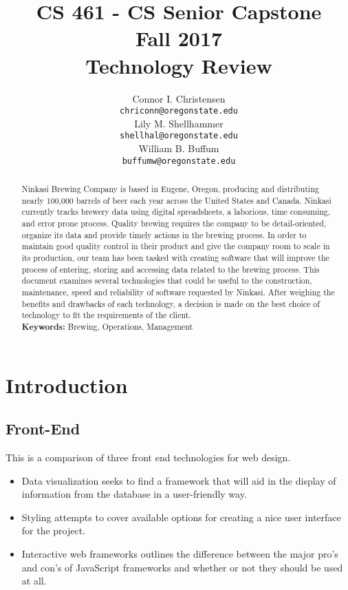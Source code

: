 \documentclass[draftclsnofoot,onecolumn,letterpaper,10pt,compsoc]{IEEEtran}
\title{CS 461 - CS Senior Capstone
	\\Fall 2017
	\\Technology Review
}
\author{
	Connor I. Christensen \\
	\texttt{chriconn@oregonstate.edu}
	\\
	Lily M. Shellhammer \\
	\texttt{shellhal@oregonstate.edu}
	\\
	William B. Buffum \\
	\small{}
	\texttt{buffumw@oregonstate.edu}
}
\begin{document}
\begin{titlingpage}
    \maketitle
    \begin{abstract}
			Ninkasi Brewing Company is based in Eugene, Oregon, producing and distributing nearly 100,000 barrels of beer each year across the United States and Canada.
			Ninkasi currently tracks brewery data using digital spreadsheets, a laborious, time consuming, and error prone process.
			Quality brewing requires the company to be detail-oriented, organize its data and provide timely actions in the brewing process.
			In order to maintain good quality control in their product and give the company room to scale in its production, our team has been tasked with creating software that will improve the process of entering, storing and accessing data related to the brewing process.
			This document examines several technologies that could be useful to the construction, maintenance, speed and reliability of software requested by Ninkasi.
			After weighing the benefits and drawbacks of each technology, a decision is made on the best choice of technology to fit the requirements of the client.
			\\
			\textbf{Keywords:} Brewing, Operations, Management
    \end{abstract}
		\pagebreak
		\tableofcontents
\end{titlingpage}

\section{Introduction}

  \subsection{Front-End}
  This is a comparison of three front end technologies for web design.
  \begin{itemize}
    \item Data visualization seeks to find a framework that will aid in the display of information from the database in a user-friendly way.
    \item Styling attempts to cover available options for creating a nice user interface for the project.
    \item Interactive web frameworks outlines the difference between the major pro's and con's of JavaScript frameworks and whether or not they should be used at all.
  \end{itemize}
\end{document}
